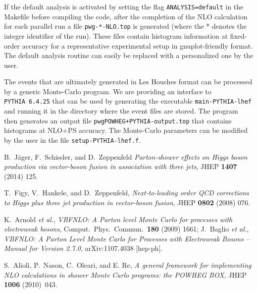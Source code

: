\documentclass[a4paper,11pt]{article}
\newcommand\PYTHIA{{\tt PYTHIA}}
\begin{document}
If the default analysis is activated by setting the flag 
{\tt ANALYSIS=default} in the Makefile before compiling the code, after the completion of the NLO calculation for each parallel run a file {\tt  pwg-*-NLO.top} is generated (where the * denotes the integer
identifier of the run). These files contain histogram information at fixed-order accuracy for a representative experimental setup in gnuplot-friendly format. The default analysis routine can easily be replaced with a personalized one by the user.  

The events that are ultimately generated in Les Houches format can be processed by a generic Monte-Carlo program. We are providing an interface to \PYTHIA~{\tt 6.4.25} that can be used by generating the executable {\tt main-PYTHIA-lhef} and running it in the directory where the event files are stored. The program then generates an output file {\tt pwgPOWHEG+PYTHIA-output.top} that contains histograms at NLO+PS accuracy. The Monte-Carlo parameters can be modified by the user in the file {\tt setup-PYTHIA-lhef.f}. 

%
\begin{thebibliography}{99}

 B.~J\"ager, F.~Schissler, and D.~Zeppenfeld {\em Parton-shower effects on Higgs boson production via vector-boson fusion in association with three jets}, 
JHEP {\bf 1407} (2014) 125. 

  T.~Figy, V.~Hankele, and D.~Zeppenfeld,
  {\em Next-to-leading order QCD corrections to Higgs plus three jet production in vector-boson fusion},
  JHEP {\bf 0802} (2008) 076.
  
  K.~Arnold {\it et al.},
 {\em VBFNLO: A Parton level Monte Carlo for processes with electroweak bosons},
  Comput.\ Phys.\ Commun.\  {\bf 180} (2009) 1661;  
   J.~Baglio {\it et al.},
  {\em VBFNLO: A Parton Level Monte Carlo for Processes with Electroweak Bosons -- Manual for Version 2.7.0},
  arXiv:1107.4038 [hep-ph].


 S.~Alioli, P.~Nason, C.~Oleari, and E. Re, {\em
    A general framework for implementing NLO calculations in shower
    Monte Carlo programs: the POWHEG BOX}, JHEP {\bf 1006} (2010)~043. %

\end{thebibliography}
\end{document}
